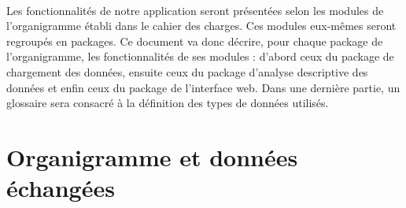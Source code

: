 		\paragraph{}Les fonctionnalités de notre application seront présentées selon les modules de l'organigramme établi dans le cahier des charges. Ces modules eux-mêmes seront regroupés en packages. Ce document va donc décrire, pour chaque package de l'organigramme, les fonctionnalités de ses modules : d'abord ceux du package de chargement des données, ensuite ceux du package d'analyse descriptive des données et enfin ceux du package de l'interface web. Dans une dernière partie, un glossaire sera consacré à la définition des types de données utilisés.
		
	\section{Organigramme et données échangées}
			
